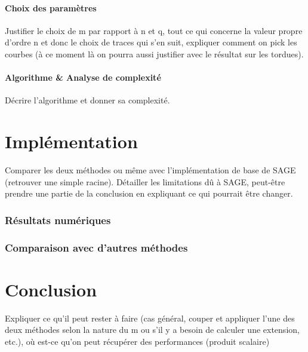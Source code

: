 \documentclass[a4paper]{article} %
\numberwithin{section}{part}
\numberwithin{equation}{section}
\begin{document}
\subsection{Choix des paramètres}
Justifier le choix de m par rapport à n et q, tout ce qui concerne la valeur 
propre d'ordre n et donc le choix de traces qui s'en suit, expliquer comment on
pick les courbes (à ce moment là on pourra aussi justifier avec le résultat 
sur les tordues).
\subsection{Algorithme \& Analyse de complexité}
Décrire l'algorithme et donner sa complexité.

\part{Implémentation}
Comparer les deux méthodes ou même avec l'implémentation de base de SAGE 
(retrouver une simple racine). Détailler les limitations dû à SAGE, peut-être
prendre une partie de la conclusion en expliquant ce qui pourrait être changer.

\section{Résultats numériques}

\section{Comparaison avec d'autres méthodes}

\part{Conclusion}
Expliquer ce qu'il peut rester à faire (cas général, couper et appliquer 
l'une des deux méthodes selon la nature du m ou s'il y a besoin de calculer 
une extension, etc.), où est-ce qu'on peut récupérer des performances 
(produit scalaire)
\end{document}

